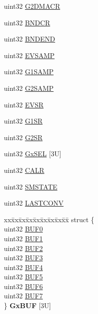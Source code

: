 \begin{DoxyCompactItemize}
\item 
uint32 \mbox{\hyperlink{structadcBase_a3e1813e77419560cb49993375ca47550}{G2\+D\+M\+A\+CR}}
\item 
uint32 \mbox{\hyperlink{structadcBase_a8b0c93685565a1cb68e820f3e97c0407}{B\+N\+D\+CR}}
\item 
uint32 \mbox{\hyperlink{structadcBase_adf1c5b2f008827e3a0af2f4e29ae083f}{B\+N\+D\+E\+ND}}
\item 
uint32 \mbox{\hyperlink{structadcBase_aff7aa7e845213967950de59bffd71898}{E\+V\+S\+A\+MP}}
\item 
uint32 \mbox{\hyperlink{structadcBase_a4a843c194f6052e2621858f1fcd6aea2}{G1\+S\+A\+MP}}
\item 
uint32 \mbox{\hyperlink{structadcBase_ad04c75ac0aeca79ac543a1699fa7fb9c}{G2\+S\+A\+MP}}
\item 
uint32 \mbox{\hyperlink{structadcBase_a0d81378c97b884564a6ff45783bc2238}{E\+V\+SR}}
\item 
uint32 \mbox{\hyperlink{structadcBase_a4b315d87ee4ab0e865e0a83bc65cc043}{G1\+SR}}
\item 
uint32 \mbox{\hyperlink{structadcBase_acdaa0ea6d9e43fee7956a8d5ef57183a}{G2\+SR}}
\item 
uint32 \mbox{\hyperlink{structadcBase_abe57fd7b19c1cf1882361821a2a4aa70}{Gx\+S\+EL}} \mbox{[}3\+U\mbox{]}
\item 
uint32 \mbox{\hyperlink{structadcBase_aee3b42bbd787ba364bfa0d916895f16c}{C\+A\+LR}}
\item 
uint32 \mbox{\hyperlink{structadcBase_abd20ccb8b7198d4988ea394463d237e3}{S\+M\+S\+T\+A\+TE}}
\item 
uint32 \mbox{\hyperlink{structadcBase_a3aec3d5bb163ce998aee14b5fc8f2205}{L\+A\+S\+T\+C\+O\+NV}}
\item 
\mbox{\label{structadcBase_a2cbf53657ac207cc4899419d3b937801}} 
\begin{tabbing}
xx\=xx\=xx\=xx\=xx\=xx\=xx\=xx\=xx\=\kill
struct \{\\
\>uint32 \mbox{\hyperlink{structadcBase_ac4fcd2c72e602ab9c2a3e82071982a80}{BUF0}}\\
\>uint32 \mbox{\hyperlink{structadcBase_a29cda6c2d65c2a7881c7d563d0c0c02a}{BUF1}}\\
\>uint32 \mbox{\hyperlink{structadcBase_ab6fa27c398c322a850a11f7c5c83f5bb}{BUF2}}\\
\>uint32 \mbox{\hyperlink{structadcBase_ae0c0e966cb8f9b428cdf25d601b9edfb}{BUF3}}\\
\>uint32 \mbox{\hyperlink{structadcBase_a54cb862a6ec349279eb3a9c7e1e0404e}{BUF4}}\\
\>uint32 \mbox{\hyperlink{structadcBase_aa93848e32e422a324c088ca0e8c74ab5}{BUF5}}\\
\>uint32 \mbox{\hyperlink{structadcBase_a29d8751033377855800a4654a90a8095}{BUF6}}\\
\>uint32 \mbox{\hyperlink{structadcBase_a36ab18ace961a0dbb00a2654180c5701}{BUF7}}\\
\} {\bfseries GxBUF} \mbox{[}3U\mbox{]}\\


\end{tabbing}
\end{DoxyCompactItemize}
